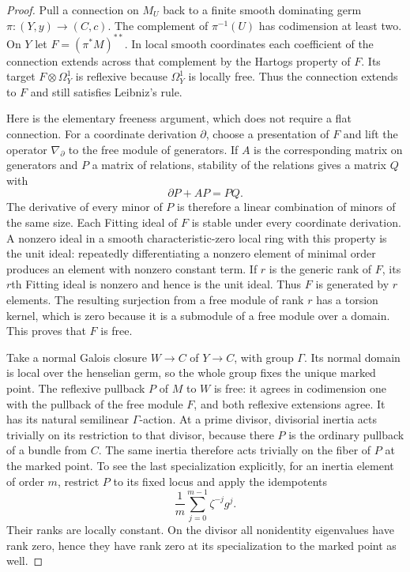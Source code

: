 \begin{proof}
Pull a connection on $M_U$ back to a finite smooth dominating germ
$\pi:(Y,y)\to(C,c)$.  The complement of $\pi^{-1}(U)$ has
codimension at least two.  On $Y$ let
$F=(\pi^*M)^{**}$.  In local smooth coordinates each coefficient
of the connection extends across that complement by the Hartogs
property of $F$.  Its target $F\otimes\Omega_Y^1$ is reflexive
because $\Omega_Y^1$ is locally free.  Thus the connection extends
to $F$ and still satisfies Leibniz's rule.

Here is the elementary freeness argument, which does not require a
flat connection.  For a coordinate derivation $\partial$, choose a
presentation of $F$ and lift the operator $\nabla_{\partial}$ to
the free module of generators.  If $A$ is the corresponding matrix
on generators and $P$ a matrix of relations, stability of the
relations gives a matrix $Q$ with
\[
                 \partial P+AP=PQ.
\]
The derivative of every minor of $P$ is therefore a linear
combination of minors of the same size.  Each Fitting ideal of $F$
is stable under every coordinate derivation.  A nonzero ideal in a
smooth characteristic-zero local ring with this property is the
unit ideal: repeatedly differentiating a nonzero element of minimal
order produces an element with nonzero constant term.  If $r$ is
the generic rank of $F$, its $r$th Fitting ideal is nonzero and hence
is the unit ideal.  Thus $F$ is generated by $r$ elements.  The
resulting surjection from a free module of rank $r$ has a torsion
kernel, which is zero because it is a submodule of a free module
over a domain.  This proves that $F$ is free.

Take a normal Galois closure $W\to C$ of $Y\to C$, with group
$\Gamma$.  Its normal domain is local over the henselian germ,
so the whole group fixes the unique marked point.  The
reflexive pullback $P$ of $M$ to $W$ is free: it agrees in
codimension one with the pullback of the free module $F$, and both
reflexive extensions agree.  It has its natural semilinear
$\Gamma$-action.  At a prime divisor, divisorial inertia acts
trivially on its restriction to that divisor, because there $P$
is the ordinary pullback of a bundle from $C$.  The same inertia
therefore acts trivially on the fiber of $P$ at the marked point.
To see the last specialization explicitly, for an inertia element
of order $m$, restrict $P$ to its fixed locus and apply the
idempotents
\[
       \frac1m\sum_{j=0}^{m-1}\zeta^{-j}g^j.
\]
Their ranks are locally constant.  On the divisor all nonidentity
eigenvalues have rank zero, hence they have rank zero at its
specialization to the marked point as well.


\end{proof}
